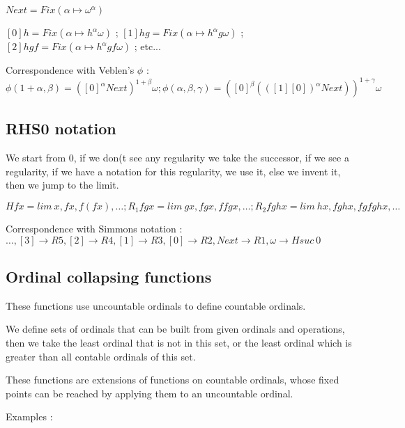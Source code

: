 \documentclass[10pt]{article}
\begin{document}
\( Next = Fix (\alpha \mapsto \omega^\alpha) \) 

\( [0] h = Fix (\alpha \mapsto h^\alpha \omega) \) ;
\( [1] h g = Fix (\alpha \mapsto h^\alpha g \omega) \) ;
\( [2] h g f = Fix (\alpha \mapsto h^\alpha g f \omega) \) ; etc...

Correspondence with Veblen's \(\phi\) : \( \phi(1+\alpha,\beta) = ([0]^\alpha Next)^{1+\beta} \omega ; 
 \phi(\alpha,\beta,\gamma) = ([0]^\beta (([1] [0])^\alpha Next))^{1+\gamma} \omega \)




\subsection{RHS0 notation}

We start from 0, if we don(t see any regularity we take the successor, if we see a regularity, if we have a notation for this regularity, we use it, else we invent it, then we jump to the limit.

\( H f x = lim\ x, f x, f (f x), \ldots ; R_1 f g x = lim\ g x, f g x, f f g x, \ldots ; R_2 f g h x = lim\ h x, f g h x, f g f g h x, \ldots \)

Correspondence with Simmons notation : 
\( \ldots, [3] \rightarrow R5, [2] \rightarrow R4, [1] \rightarrow R3, [0] \rightarrow R2, Next \rightarrow R1, \omega \rightarrow H suc\ 0 \)



\subsection{Ordinal collapsing functions}

These functions use uncountable ordinals to define countable ordinals.

We define sets of ordinals that can be built from given ordinals and operations, then we take the least ordinal that is not in this set, or the least ordinal which is greater than all contable ordinals of this set.

These functions are extensions of functions on countable ordinals, whose fixed points can be reached by applying them to an uncountable ordinal.

Examples :
\end{document}
